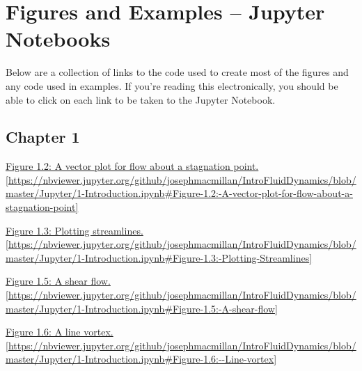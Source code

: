 
\chapter{Figures and Examples -- Jupyter Notebooks}

Below are a collection of links to the code used to create most of the figures and any code used in examples.  If you're reading this electronically, you should be able to click on each link to be taken to the Jupyter Notebook.

\section{Chapter 1}

\href{https://nbviewer.jupyter.org/github/josephmacmillan/IntroFluidDynamics/blob/master/Jupyter/1-Introduction.ipynb#Figure-1.2:-A-vector-plot-for-flow-about-a-stagnation-point}{Figure 1.2: A vector plot for flow about a stagnation point.  [\url{https://nbviewer.jupyter.org/github/josephmacmillan/IntroFluidDynamics/blob/master/Jupyter/1-Introduction.ipynb\#Figure-1.2:-A-vector-plot-for-flow-about-a-stagnation-point}]}

\vspace{0.1in}

\noindent \href{https://nbviewer.jupyter.org/github/josephmacmillan/IntroFluidDynamics/blob/master/Jupyter/1-Introduction.ipynb#Figure-1.3:-Plotting-Streamlines}{Figure 1.3: Plotting streamlines. [\url{https://nbviewer.jupyter.org/github/josephmacmillan/IntroFluidDynamics/blob/master/Jupyter/1-Introduction.ipynb\#Figure-1.3:-Plotting-Streamlines}]}

\vspace{0.1in}

\noindent \href{https://nbviewer.jupyter.org/github/josephmacmillan/IntroFluidDynamics/blob/master/Jupyter/1-Introduction.ipynb#Figure-1.5:-A-shear-flow}{Figure 1.5: A shear flow. [\url{https://nbviewer.jupyter.org/github/josephmacmillan/IntroFluidDynamics/blob/master/Jupyter/1-Introduction.ipynb\#Figure-1.5:-A-shear-flow}]}

\vspace{0.1in}

\noindent \href{https://nbviewer.jupyter.org/github/josephmacmillan/IntroFluidDynamics/blob/master/Jupyter/1-Introduction.ipynb#Figure-1.6:--Line-vortex}{Figure 1.6: A line vortex. [\url{https://nbviewer.jupyter.org/github/josephmacmillan/IntroFluidDynamics/blob/master/Jupyter/1-Introduction.ipynb\#Figure-1.6:--Line-vortex}]}
